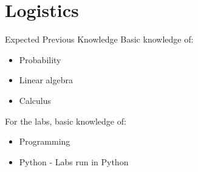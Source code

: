 \documentclass[aspectratio=169,10pt]{beamer}
\begin{document}
\section{Logistics}
\begin{frame}{Expected Previous Knowledge}
	Basic knowledge of:
	\begin{itemize}
		\item Probability
		\item Linear algebra
		\item Calculus
	\end{itemize}
	
	\vspace{1cm}
	For the labs, basic knowledge of:
	\begin{itemize}
		\item Programming
		\item Python - Labs run in Python
	\end{itemize}	
\end{frame}
\end{document}
